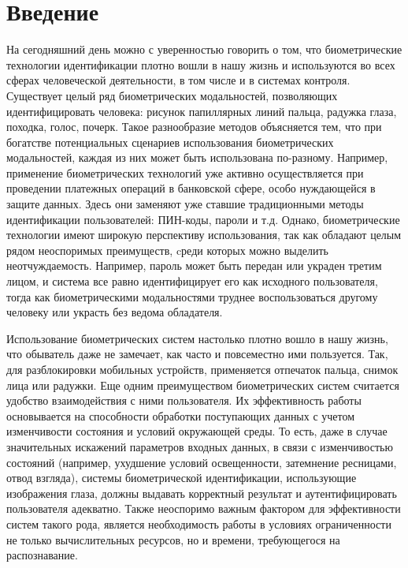 \documentclass[12pt,a4paper]{article} %
\begin{document}
\newpage
\tableofcontents
 


\newpage
\section{Введение}

На сегодняшний день можно с уверенностью говорить о том, что биометрические технологии идентификации плотно вошли в нашу жизнь и используются во всех сферах человеческой деятельности, в том числе и в системах контроля. Существует целый ряд биометрических модальностей, позволяющих идентифицировать человека: рисунок папиллярных линий пальца, радужка глаза, походка, голос, почерк. Такое разнообразие методов объясняется тем, что при богатстве потенциальных сценариев использования биометрических модальностей, каждая из них может быть использована по-разному. Например, применение биометрических технологий уже активно осуществляется при проведении платежных операций в банковской сфере, особо нуждающейся в защите данных. Здесь они заменяют уже ставшие традиционными методы идентификации пользователей: ПИН-коды, пароли и т.д. Однако, биометрические технологии имеют широкую перспективу использования, так как обладают целым рядом неоспоримых преимуществ, cреди которых можно выделить неотчуждаемость. Например, пароль может быть передан или украден третим лицом, и система все равно идентифицирует его как исходного пользователя, тогда как биометрическими модальностями труднее воспользоваться другому человеку или украсть без ведома обладателя. 

Использование биометрических систем настолько плотно вошло в нашу жизнь, что обыватель даже не замечает, как часто и повсеместно ими пользуется. Так, для разблокировки мобильных устройств, применяется отпечаток пальца, снимок лица или радужки. Еще одним преимуществом биометрических систем считается удобство взаимодействия с ними пользователя. Их эффективность работы основывается на способности обработки поступающих данных с учетом изменчивости состояния и условий окружающей среды. То есть, даже в случае значительных искажений параметров входных данных, в связи с изменчивостью состояний (например, ухудшение условий освещенности, затемнение ресницами, отвод взгляда), системы биометрической идентификации, использующие изображения глаза, должны выдавать корректный результат и аутентифицировать пользователя адекватно. Также неоспоримо важным фактором для эффективности систем такого рода, является необходимость работы в условиях ограниченности не только вычислительных ресурсов, но и времени, требующегося на распознавание. 
\end{document}
